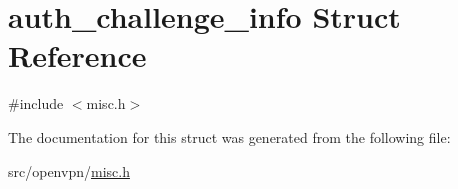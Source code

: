 \hypertarget{structauth__challenge__info}{}\section{auth\+\_\+challenge\+\_\+info Struct Reference}
\label{structauth__challenge__info}


{\ttfamily \#include $<$misc.\+h$>$}



The documentation for this struct was generated from the following file\+:\begin{DoxyCompactItemize}
\item 
src/openvpn/\hyperlink{misc_8h}{misc.\+h}\end{DoxyCompactItemize}
